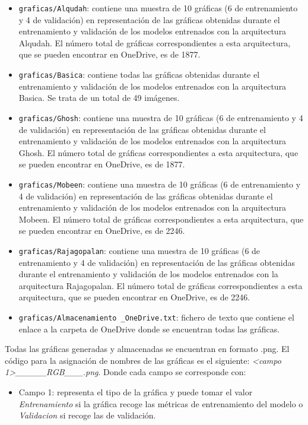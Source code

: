 \begin{itemize}
    \begin{itemize}
        \item \texttt{graficas/Alqudah}: contiene una muestra de 10 gráficas (6 de entrenamiento y 4 de validación) en representación de las gráficas obtenidas durante el entrenamiento y validación de los modelos entrenados con la arquitectura Alqudah. El número total de gráficas correspondientes a esta arquitectura, que se pueden encontrar en OneDrive, es de 1877.
        \item \texttt{graficas/Basica}: contiene todas las gráficas obtenidas durante el entrenamiento y validación de los modelos entrenados con la arquitectura Basica. Se trata de un total de 49 imágenes.
        \item \texttt{graficas/Ghosh}: contiene una muestra de 10 gráficas (6 de entrenamiento y 4 de validación) en representación de las gráficas obtenidas durante el entrenamiento y validación de los modelos entrenados con la arquitectura Ghosh. El número total de gráficas correspondientes a esta arquitectura, que se pueden encontrar en OneDrive, es de 1877.
        \item \texttt{graficas/Mobeen}: contiene una muestra de 10 gráficas (6 de entrenamiento y 4 de validación) en representación de las gráficas obtenidas durante el entrenamiento y validación de los modelos entrenados con la arquitectura Mobeen. El número total de gráficas correspondientes a esta arquitectura, que se pueden encontrar en OneDrive, es de 2246.
        \item \texttt{graficas/Rajagopalan}: contiene una muestra de 10 gráficas (6 de entrenamiento y 4 de validación) en representación de las gráficas obtenidas durante el entrenamiento y validación de los modelos entrenados con la arquitectura Rajagopalan. El número total de gráficas correspondientes a esta arquitectura, que se pueden encontrar en OneDrive, es de 2246.
        \item \texttt{graficas/Almacenamiento \_OneDrive.txt}: fichero de texto que contiene el enlace a la carpeta de OneDrive donde se encuentran todas las gráficas.
    \end{itemize}
    Todas las gráficas generadas y almacenadas se encuentran en formato .png. El código para la asignación de nombres de las gráficas es el siguiente: \textit{<campo 1>\_<campo 2>\_<campo 3>\_<campo 4>\_<campo 5>\_RGB\_<campo 6>\_<campo 7>\_<campo 8>.png}. Donde cada campo se corresponde con:
    \begin{itemize}
        \item Campo 1: representa el tipo de la gráfica y puede tomar el valor \textit{Entrenamiento} si la gráfica recoge las métricas de entrenamiento del modelo o \textit{Validacion} si recoge las de validación.

\end{itemize}
\end{itemize}
